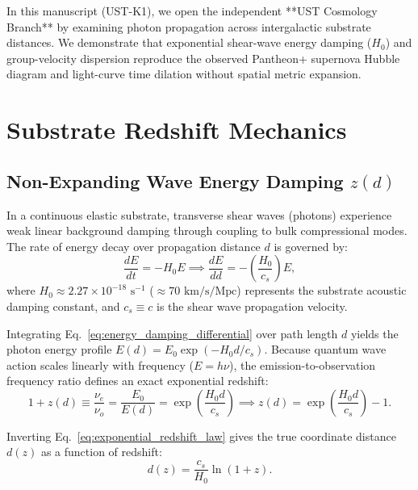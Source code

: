 \documentclass[11pt,a4paper]{article}
\begin{document}
	In this manuscript (UST-K1), we open the independent **UST Cosmology Branch** by examining photon propagation across intergalactic substrate distances. We demonstrate that exponential shear-wave energy damping ($H_0$) and group-velocity dispersion reproduce the observed Pantheon+ supernova Hubble diagram and light-curve time dilation without spatial metric expansion.
	
	\section{Substrate Redshift Mechanics}
	\label{sec:redshift_mechanics}
	
	\subsection{Non-Expanding Wave Energy Damping $z(d)$}
	In a continuous elastic substrate, transverse shear waves (photons) experience weak linear background damping through coupling to bulk compressional modes. The rate of energy decay over propagation distance $d$ is governed by:
	\begin{equation}
		\frac{dE}{dt} = -H_0 E \implies \frac{dE}{dd} = -\left(\frac{H_0}{c_s}\right) E,
		\label{eq:energy_damping_differential}
	\end{equation}
	where $H_0 \approx 2.27 \times 10^{-18} \text{ s}^{-1}$ ($\approx 70 \text{ km/s/Mpc}$) represents the substrate acoustic damping constant, and $c_s \equiv c$ is the shear wave propagation velocity.
	
	Integrating Eq.\ \eqref{eq:energy_damping_differential} over path length $d$ yields the photon energy profile $E(d) = E_0 \exp(-H_0 d / c_s)$. Because quantum wave action scales linearly with frequency ($E = h\nu$), the emission-to-observation frequency ratio defines an exact exponential redshift:
	\begin{equation}
		1 + z(d) \equiv \frac{\nu_e}{\nu_o} = \frac{E_0}{E(d)} = \exp\left(\frac{H_0 d}{c_s}\right) \implies z(d) = \exp\left(\frac{H_0 d}{c_s}\right) - 1.
		\label{eq:exponential_redshift_law}
	\end{equation}
	
	Inverting Eq.\ \eqref{eq:exponential_redshift_law} gives the true coordinate distance $d(z)$ as a function of redshift:
	\begin{equation}
		d(z) = \frac{c_s}{H_0} \ln(1 + z).
		\label{eq:coordinate_distance_def}
	\end{equation}
	
\end{document}
